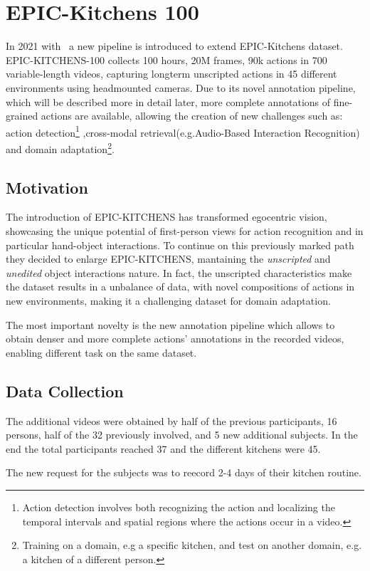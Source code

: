 \section{EPIC-Kitchens 100}\label{sec:EK100}
In 2021 with~\cite{EK100} a new pipeline is introduced to extend EPIC-Kitchens dataset.
EPIC-KITCHENS-100 collects 100 hours, 20M frames, 90k actions in 700 variable-length
videos, capturing longterm unscripted actions in 45 different environments using headmounted
cameras. Due to its novel annotation pipeline, which will be described more in detail later,
more complete annotations of fine-grained actions are available, allowing the creation of new challenges
such as: action detection\footnote{Action detection involves both recognizing the action and localizing the temporal intervals and spatial regions where the actions occur in a video.}
,cross-modal retrieval(e.g.Audio-Based Interaction Recognition) and domain adaptation\footnote{Training on a domain, e.g a specific kitchen, and test on another domain, e.g. a kitchen of a different person.}.
\subsection{Motivation}
The introduction of EPIC-KITCHENS has transformed egocentric vision, showcasing the unique potential of
first-person views for action recognition and in particular hand-object interactions. To continue
on this previously marked path they decided to enlarge EPIC-KITCHENS, mantaining the \textit{unscripted}
and \textit{unedited} object interactions nature. In fact, the unscripted characteristics make 
the dataset results in a unbalance of data, with novel compositions of actions in new environments,
making it a challenging dataset for domain adaptation.

The most important novelty is the new annotation pipeline which allows to obtain denser and more complete actions'
annotations in the recorded videos, enabling different task on the same dataset.

\subsection{Data Collection}
The additional videos were obtained by half of the previous participants, 16 persons, half of the 
32 previously involved, and 5 new additional subjects. In the end the total participants reached 37
and the different kitchens were 45. 

The new request for the subjects was to reecord 2-4 days of their kitchen routine.

